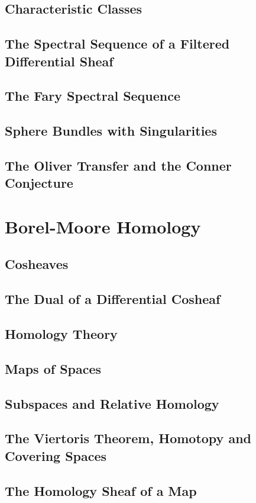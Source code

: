 \subsection{Characteristic Classes}
\subsection{The Spectral Sequence of a Filtered Differential Sheaf}
\subsection{The Fary Spectral Sequence}
\subsection{Sphere Bundles with Singularities}
\subsection{The Oliver Transfer and the Conner Conjecture}

\section{Borel-Moore Homology}
\subsection{Cosheaves}
\subsection{The Dual of a Differential Cosheaf}
\subsection{Homology Theory}
\subsection{Maps of Spaces}
\subsection{Subspaces and Relative Homology}
\subsection{The Viertoris Theorem, Homotopy and Covering Spaces}
\subsection{The Homology Sheaf of a Map}

